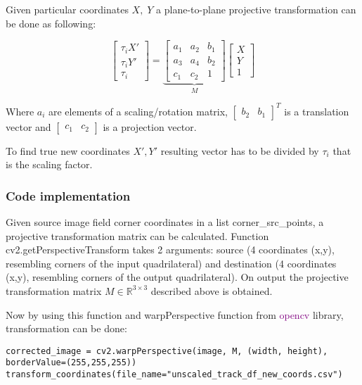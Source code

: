 Given particular coordinates $X,\;Y$ a plane-to-plane projective transformation can be done as following:

$$
\begin{bmatrix}
\tau_{i}X' \\
\tau_{i}Y' \\
\tau_{i}
\end{bmatrix} = 
\underbrace{ \begin{bmatrix}
a_{1} & a_{2} & b_{1} \\
a_{3} & a_{4} & b_{2} \\
c_{1} & c_{2} & 1
\end{bmatrix} }_{ M } \begin{bmatrix}
X \\
Y \\
1
\end{bmatrix}
$$

Where $a_i$ are elements of a scaling/rotation matrix, $\begin{bmatrix}
    b_2 & b_1
\end{bmatrix}^T$ is a translation vector and $\begin{bmatrix}
    c_1 & c_2
\end{bmatrix}$ is a projection vector.

To find true new coordinates $X', Y'$ resulting vector has to be divided by $\tau_i$ that is the scaling factor. 

\subsubsection{Code implementation}

Given source image field corner coordinates in a list corner\_src\_points, a projective transformation matrix can be calculated. Function cv2.getPerspectiveTransform takes 2 arguments: source (4 coordinates (x,y), resembling corners of the input quadrilateral) and destination (4 coordinates (x,y), resembling corners of the output quadrilateral). On output the projective transformation matrix $M \in \mathbb{R}^{3 \times 3}$ described above is obtained.



\pagebreak


Now by using this function and warpPerspective function from \textcolor{purple}{opencv} library, transformation can be done:
\begin{lstlisting}
corrected_image = cv2.warpPerspective(image, M, (width, height), borderValue=(255,255,255))
transform_coordinates(file_name="unscaled_track_df_new_coords.csv")
\end{lstlisting}

